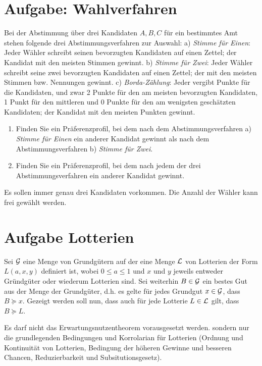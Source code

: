 \documentclass[10pt, a4paper, german]{article}
\numberwithin {equation}{section}
\begin{document}
\section{Aufgabe: Wahlverfahren}

Bei der Abstimmung über drei Kandidaten $A, B, C$ für ein bestimmtes Amt stehen
folgende drei Abstimmungsverfahren zur Auswahl: a) {\em Stimme für Einen}:
Jeder Wähler schreibt seinen bevorzugten Kandidaten auf einen
Zettel; der Kandidat mit den meisten Stimmen gewinnt. b) {\em Stimme für Zwei}:
Jeder Wähler schreibt seine zwei bevorzugten Kandidaten auf einen Zettel; der
mit den meisten Stimmen bzw. Nennungen gewinnt. c) {\em Borda-Zählung}: Jeder
vergibt Punkte für die Kandidaten, und zwar 2 Punkte für den am meisten
bevorzugten Kandidaten, 1 Punkt für den mittleren und 0 Punkte für den am
wenigsten geschätzten Kandidaten; der Kandidat mit den meisten Punkten gewinnt.

\begin{enumerate}
  \item Finden Sie ein Präferenzprofil, bei dem nach dem Abstimmungsverfahren
  a) {\em Stimme für Einen} ein anderer Kandidat gewinnt als nach dem
  Abstimmungsverfahren b) {\em Stimme für Zwei}.
  \item Finden Sie ein Präferenzprofil, bei dem nach jedem der drei
  Abstimmungsverfahren ein anderer Kandidat gewinnt.
\end{enumerate}

Es sollen immer genau drei Kandidaten vorkommen. Die Anzahl der Wähler kann
frei gewählt werden.


\section{Aufgabe Lotterien}

Sei ${\cal G}$ eine Menge von Grundgütern auf der eine Menge ${\cal L}$ von
Lotterien der Form $L(a, x, y)$ definiert ist, wobei $0 \leq a \leq 1$ und $x$
und $y$ jeweils entweder Gründgüter oder wiederum Lotterien sind. Sei weiterhin
$B \in {\cal G}$ ein bestes Gut aus der Menge der Grundgüter, d.h. es gelte
für jedes Grundgut $x \in {\cal G}$, dass $B \succeq x$. Gezeigt werden soll
nun, dass auch für jede Lotterie $L \in {\cal L}$ gilt, dass $B \succeq L$.

Es darf nicht das Erwartungsnutzentheorem vorausgesetzt werden.
sondern nur die grundlegenden Bedingungen und Korrolarian für
Lotterien (Ordnung und Kontinuität von Lotterien, Bedingung der
höheren Gewinne und besseren Chancen, Reduzierbarkeit und
Subsitutionsgesetz).
\end{document}
